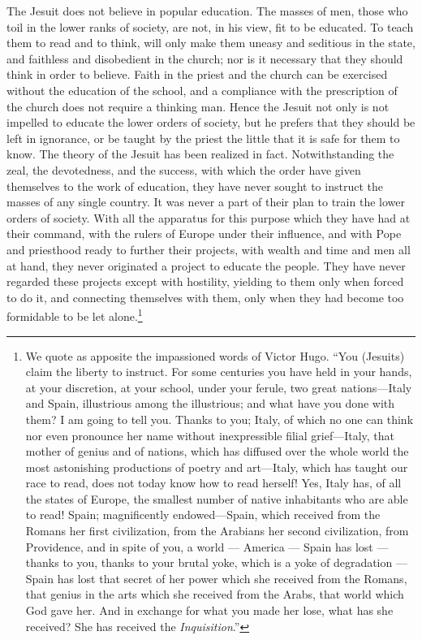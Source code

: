 \documentclass[]{book}
\let\rmarkdownfootnote\footnote%
\def\footnote{\protect\rmarkdownfootnote}
\begin{document}
The Jesuit does not believe in popular education. The masses of men, those who toil in the lower ranks of society, are not, in his view, fit to be educated. To teach them to read and to think, will only make them uneasy and seditious in the state, and faithless and disobedient in the church; nor is it necessary that they should think in order to believe. Faith in the priest and the church can be exercised without the education of the school, and a compliance with the prescription of the church does not require a thinking man. Hence the Jesuit not only is not impelled to educate the lower orders of society, but he prefers that they should be left in ignorance, or be taught by the priest the little that it is safe for them to know. The theory of the Jesuit has been realized in fact. Notwithstanding the zeal, the devotedness, and the success, with which the order have given themselves to the work of education, they have never sought to instruct the masses of any single country. It was never a part of their plan to train the lower orders of society. With all the apparatus for this purpose which they have had at their command, with the rulers of Europe under their influence, and with Pope and priesthood ready to further their projects, with wealth and time and men all at hand, they never originated a project to educate the people. They have never regarded these projects except with hostility, yielding to them only when forced to do it, and connecting themselves with them, only when they had become too formidable to be let alone.\footnote{We quote as apposite the impassioned words of Victor Hugo. ``You (Jesuits) claim the liberty to instruct. For some centuries you have held in your hands, at your discretion, at your school, under your ferule, two great nations---Italy and Spain, illustrious among the illustrious; and what have you done with them? I am going to tell you. Thanks to you; Italy, of which no one can think nor even pronounce her name without inexpressible filial grief---Italy, that mother of genius and of nations, which has diffused over the whole world the most astonishing productions of poetry and art---Italy, which has taught our race to read, does not today know how to read herself! Yes, Italy has, of all the states of Europe, the smallest number of native inhabitants who are able to read! Spain; magnificently endowed---Spain, which received from the Romans her first civilization, from the Arabians her second civilization, from Providence, and in spite of you, a world --- America --- Spain has lost --- thanks to you, thanks to your brutal yoke, which is a yoke of degradation --- Spain has lost that secret of her power which she received from the Romans, that genius in the arts which she received from the Arabs, that world which God gave her. And in exchange for what you made her lose, what has she received? She has received the \emph{Inquisition}.''}
\end{document}
